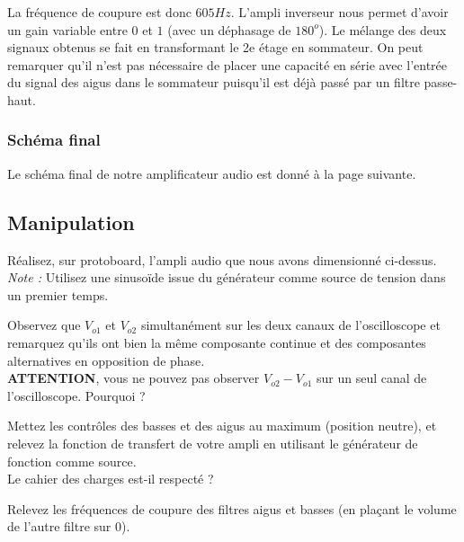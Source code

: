 \documentclass{../template/labo}
\begin{document}
La fréquence de coupure est donc $605Hz$.
L'ampli inverseur nous permet d'avoir un gain variable entre $0$ et $1$ (avec un déphasage de $180^{o}$).
Le mélange des deux signaux obtenus se fait en transformant le 2e étage en sommateur. On peut remarquer qu'il n'est pas nécessaire de placer une capacité en série avec l'entrée du signal des aigus dans le sommateur puisqu'il est déjà passé par un filtre passe-haut.

\subsubsection{Schéma final}
Le schéma final de notre amplificateur audio est donné à la page suivante.

\subsection{Manipulation}
\Question
{
Réalisez, sur protoboard, l'ampli audio que nous avons dimensionné ci-dessus.
\textit{Note :} Utilisez une sinusoïde issue du générateur comme source de tension dans un premier temps.
}
{}

\Question
{
Observez que $V_{o1}$ et $V_{o2}$ simultanément sur les deux canaux de l'oscilloscope et remarquez qu'ils ont bien la même composante continue et des composantes alternatives en opposition de phase.\\
\textbf{ATTENTION}, vous ne pouvez pas observer $V_{o2} - V_{o1}$ sur un seul canal de l'oscilloscope. Pourquoi ?
}
{}

\Question
{
Mettez les contrôles des basses et des aigus au maximum (position neutre), et relevez la fonction de transfert de votre ampli en utilisant le générateur de fonction comme source.\\
Le cahier des charges est-il respecté ?
}
{}

\Question
{
Relevez les fréquences de coupure des filtres aigus et basses (en plaçant le volume de l'autre filtre sur $0$).
}
{}
\end{document}
